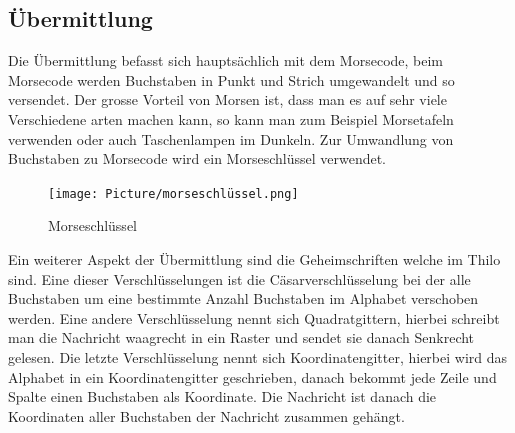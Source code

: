 \subsection*{Übermittlung}
Die Übermittlung befasst sich hauptsächlich mit dem Morsecode, beim Morsecode werden Buchstaben in Punkt und Strich umgewandelt und so versendet. Der grosse Vorteil von Morsen ist, dass man es auf sehr viele Verschiedene arten machen kann, so kann man zum Beispiel Morsetafeln verwenden oder auch Taschenlampen im Dunkeln. Zur Umwandlung von Buchstaben zu Morsecode wird ein Morseschlüssel verwendet.
\begin{figure}
    \centering
    \texttt{[image: Picture/morseschlüssel.png]}
    \caption{Morseschlüssel}
\end{figure}
\par
Ein weiterer Aspekt der Übermittlung sind die Geheimschriften welche im Thilo \cite{noauthor_thilo_2014} sind. Eine dieser Verschlüsselungen ist die Cäsarverschlüsselung bei der alle Buchstaben um eine bestimmte Anzahl Buchstaben im Alphabet verschoben werden. Eine andere Verschlüsselung nennt sich Quadratgittern, hierbei schreibt man die Nachricht waagrecht in ein Raster und sendet sie danach Senkrecht gelesen. Die letzte Verschlüsselung nennt sich Koordinatengitter, hierbei wird das Alphabet in ein Koordinatengitter geschrieben, danach bekommt jede Zeile und Spalte einen Buchstaben als Koordinate. Die Nachricht ist danach die Koordinaten aller Buchstaben der Nachricht zusammen gehängt.

